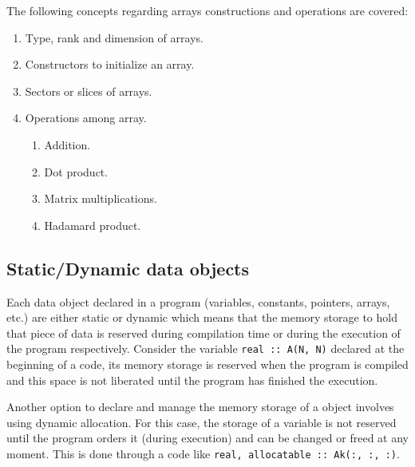 
The following concepts regarding arrays constructions and operations are covered:
\begin{enumerate} 
    \item Type, rank and dimension of arrays.
    \item Constructors to initialize an array. 
    \item Sectors or slices of arrays. 
    \item Operations among array. 
    
    \begin{enumerate}
        \item Addition. 
        \item Dot product.
        \item Matrix multiplications. 
        \item Hadamard product. 
    \end{enumerate}  
    
\end{enumerate} 

    \vspace{-.5cm}
    \subsection*{Static/Dynamic data objects}

Each data object declared in a program (variables, constants, pointers, arrays, etc.) are either static or dynamic 
which means that the memory storage to hold that piece of data is reserved during compilation time or 
during the execution of the program respectively. Consider the variable \texttt{real :: A(N, N)} declared at the 
beginning of a code, its memory storage is reserved when the program is compiled and this space is not liberated 
until the program has finished the execution. 

Another option to declare and manage the memory storage of a object involves using dynamic allocation. For this case, the 
storage of a variable is not reserved until the program orders it (during execution) and can be changed or freed at any moment. 
This is done through a code like \texttt{real, allocatable :: Ak(:, :, :)}.





\newpage 
